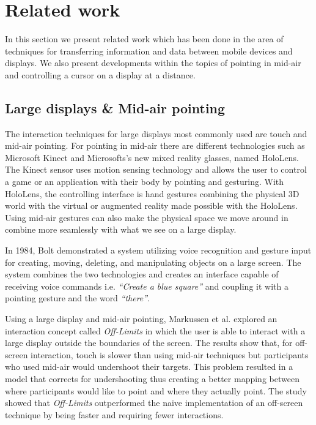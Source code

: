 \section{Related work} \label{sec:relatedwork}
In this section we present related work which has been done in the area of techniques for transferring information and data between mobile devices and displays.
We also present developments within the topics of pointing in mid-air and controlling a cursor on a display at a distance.

\subsection{Large displays \& Mid-air pointing} \label{sec:largeDisplayAirPointing}
The interaction techniques for large displays most commonly used are touch and mid-air pointing.
For pointing in mid-air there are different technologies such as Microsoft Kinect and Microsofts's new mixed reality glasses, named HoloLens.
The Kinect sensor uses motion sensing technology and allows the user to control a game or an application with their body by pointing and gesturing.
With HoloLens, the controlling interface is hand gestures combining the physical 3D world with the virtual or augmented reality made possible with the HoloLens.
Using mid-air gestures can also make the physical space we move around in combine more seamlessly with what we see on a large display.

In 1984, Bolt \cite{Bolt:1980} demonstrated a system utilizing voice recognition and gesture input for creating, moving, deleting, and  manipulating objects on a large screen.
The system combines the two technologies and creates an interface capable of receiving voice commands i.e. \textit{``Create a blue square''}  and coupling it with a pointing gesture and the word \textit{``there''}.

Using a large display and mid-air pointing, Markussen et al. \cite{Markussen:2016} explored an interaction concept called \emph{Off-Limits} in which the user is able to interact with a large display outside the boundaries of the screen.
The results show that, for off-screen interaction, touch is slower than using mid-air techniques but participants who used mid-air would undershoot their targets.
This problem resulted in a model that corrects for undershooting thus creating a better mapping between where participants would like to point and where they actually point.
The study showed that \emph{Off-Limits} outperformed the naive implementation of an off-screen technique by being faster and requiring fewer interactions.

